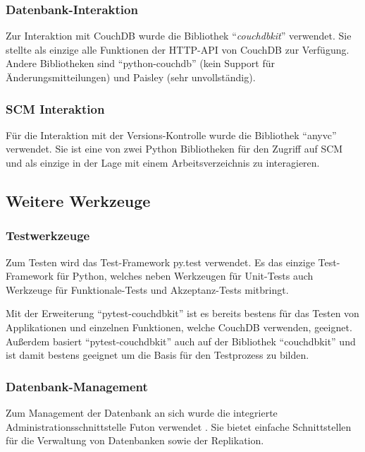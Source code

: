 \subsubsection{Datenbank-Interaktion}

Zur Interaktion mit CouchDB wurde die Bibliothek ``\emph{couchdbkit}'' \cite{couchdbkit:website} verwendet.
Sie stellte als einzige alle Funktionen der HTTP-API von CouchDB zur Verfügung.
Andere Bibliotheken sind ``python-couchdb'' (kein Support für Änderungsmitteilungen)
und Paisley (sehr unvollständig).

\subsubsection{SCM Interaktion}

Für die Interaktion mit der Versions-Kontrolle wurde die Bibliothek ``anyvc'' \cite{anyvc:website} verwendet.
Sie ist eine von zwei Python Bibliotheken für den Zugriff auf SCM
und als einzige in der Lage mit einem Arbeitsverzeichnis zu interagieren.

\subsection{Weitere Werkzeuge}

\subsubsection{Testwerkzeuge}

Zum Testen wird das Test-Framework py.test \cite{pytest:website} verwendet.
Es das einzige Test-Framework für Python,
welches neben Werkzeugen für Unit-Tests auch Werkzeuge für
Funktionale-Tests und Akzeptanz-Tests mitbringt.

Mit der Erweiterung ``pytest-couchdbkit'' \cite{pytest:couchdbkit} ist es bereits
bestens für das Testen von Applikationen und einzelnen Funktionen,
welche CouchDB verwenden, geeignet.
Außerdem basiert ``pytest-couchdbkit'' auch auf der Bibliothek ``couchdbkit''
und ist damit bestens geeignet um die Basis für den Testprozess zu bilden.

\subsubsection{Datenbank-Management}

Zum Management der Datenbank an sich wurde die integrierte Administrationsschnittstelle Futon verwendet \cite{couchdb:futon}.
Sie bietet einfache Schnittstellen für die Verwaltung von Datenbanken sowie der Replikation.

